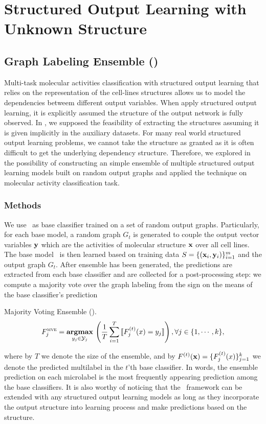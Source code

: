 {%
%
\chapter{Structured Output Learning with Unknown Structure}

%
%
\section{Graph Labeling Ensemble (\mve)}\label{sc_su11}

Multi-task molecular activities classification with structured output learning that relies on the representation of the cell-lines structures allows us to model the dependencies betweem different output variables.
When apply structured output learning, it is explicitly assumed the structure of the output network is fully observed.
In , we supposed the feasibility of extracting the structures assuming it is given implicitly in the auxiliary datasets.
For many real world structured output learning problems, we cannot take the structure as granted as it is often difficult to get the underlying dependency structure.
Therefore, we explored in  the possibility of constructing an simple ensemble of multiple structured output learning models built on random output graphs and applied the technique on molecular activity classification task.


\subsection{Methods}

We use \mmcrf\ as base classifier trained on a set of random output graphs.
Particularly, for each base model, a random graph $G_t$ is generated to couple the output vector variables $\mathbf {y}$ which are the activities of molecular structure $\mathbf {x}$ over all cell lines.
The base model \mmcrf\ is then learned based on training data $S=\{(\mathbf {x}_i,\mathbf {y}_i)\}_{i=1}^{m}$ and the output graph $G_t$.
After ensemble has been generated, the predictions are extracted from each base classifier and are collected for a post-processing step: we compute a majority vote over the graph labeling from the sign on the means of the base classifier's prediction
\begin{definition}{Majority Voting Ensemble (\mve).}
\begin{align*}
	F_j^{\text{{\sc mve}}}=\underset{y_j\in\mathcal{Y}_j}{\textbf{argmax}}\,\left(\frac{1}{T}\sum_{i=1}^{T}{\llbracket F_j^{(t)}(x)=y_j \rrbracket}\right), \forall j\in\{1,\cdots,k\},
\end{align*}
\end{definition}
where by $T$ we denote the size of the ensemble, and by $F^{(t)}(\mathbf {x})=\{F^{(t)}_j(x)\}_{j=1}^{k}$ we denote the predicted multilabel in the $t$'th base classifier.
In words, the ensemble prediction on each microlabel is the most frequently appearing prediction among the base classifiers.
It is also worthy of noticing that the \mve\ framework can be extended with any structured output learning models as long as they incorporate the output structure into learning process and make predictions based on the structure.

}
